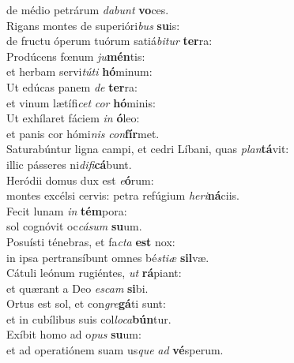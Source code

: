\oddverse de médio petrárum \textit{da}\textit{bunt} \textbf{vo}ces.\\
\evenverse Rigans montes de superióri\textit{bus} \textbf{su}is:~\*\\
\evenverse de fructu óperum tuórum satiá\textit{bi}\textit{tur} \textbf{ter}ra:\\
\oddverse Prodúcens fœnum \textit{ju}\textbf{mén}tis:~\*\\
\oddverse et herbam servi\textit{tú}\textit{ti} \textbf{hó}minum:\\
\evenverse Ut edúcas panem \textit{de} \textbf{ter}ra:~\*\\
\evenverse et vinum lætífi\textit{cet} \textit{cor} \textbf{hó}minis:\\
\oddverse Ut exhílaret fáciem \textit{in} \textbf{ó}leo:~\*\\
\oddverse et panis cor hómi\textit{nis} \textit{con}\textbf{fír}met.\\
\evenverse Saturabúntur ligna campi, et cedri Líbani, quas \textit{plan}\textbf{tá}vit:~\*\\
\evenverse illic pásseres ni\textit{di}\textit{fi}\textbf{cá}bunt.\\
\oddverse Heródii domus dux est \textit{e}\textbf{ó}rum:~\*\\
\oddverse montes excélsi cervis: petra refúgium \textit{he}\textit{ri}\textbf{ná}ciis.\\
\evenverse Fecit lunam \textit{in} \textbf{tém}pora:~\*\\
\evenverse sol cognóvit oc\textit{cá}\textit{sum} \textbf{su}um.\\
\oddverse Posuísti ténebras, et fa\textit{cta} \textbf{est} nox:~\*\\
\oddverse in ipsa pertransíbunt omnes bé\textit{sti}\textit{æ} \textbf{sil}væ.\\
\evenverse Cátuli leónum rugiéntes, \textit{ut} \textbf{rá}piant:~\*\\
\evenverse et quærant a Deo \textit{e}\textit{scam} \textbf{si}bi.\\
\oddverse Ortus est sol, et con\textit{gre}\textbf{gá}ti sunt:~\*\\
\oddverse et in cubílibus suis col\textit{lo}\textit{ca}\textbf{bún}tur.\\
\evenverse Exíbit homo ad o\textit{pus} \textbf{su}um:~\*\\
\evenverse et ad operatiónem suam us\textit{que} \textit{ad} \textbf{vé}sperum.\\
